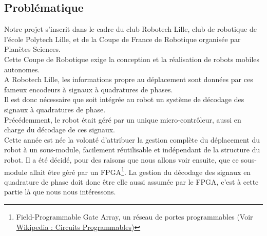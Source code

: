 \subsection{Problématique}
Notre projet s'inscrit dans le cadre du club Robotech Lille, club de robotique de l'école Polytech Lille, et de la Coupe de France de Robotique organisée par Planètes Sciences.\\

Cette Coupe de Robotique exige la conception et la réalisation de robots mobiles autonomes.\\
A Robotech Lille, les informations propre au déplacement sont données par ces fameux encodeurs à signaux à quadratures de phases.\\
Il est donc nécessaire que soit intégrée au robot un système de décodage des signaux à quadratures de phase.\\

Précédemment, le robot était géré par un unique micro-contrôleur, aussi en charge du décodage de ces signaux.\\
Cette année est née la volonté d'attribuer la gestion complète du déplacement du robot à un sous-module, facilement réutilisable et indépendant de la structure du robot. Il a été décidé, pour des raisons que nous allons voir ensuite, que ce sous-module allait \^etre géré par un FPGA\footnote{Field-Programmable Gate Array, un réseau de portes programmables (Voir 
\href{http://fr.wikipedia.org/wiki/Circuit_logique_programmable}{Wikipedia : Circuits Programmables})}. La gestion du décodage des signaux en quadrature de phase doit donc \^etre elle aussi assumée par le FPGA, c'est à cette partie là que nous nous intéressons.\\